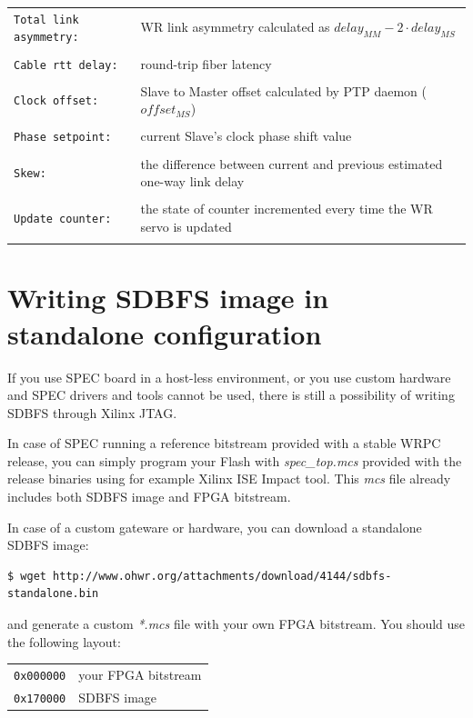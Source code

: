 \documentclass[a4paper, 12pt]{article}
\newcommand{\code}[1]{\texttt{#1}}
\begin{document}
\begin{longtable}{  p{4.5cm}  p{10cm} }
  \code{Total link asymmetry:} & WR link asymmetry calculated as
\( delay_{MM} - 2 \cdot delay_{MS} \)\\
 & \\

  \code{Cable rtt delay:} & round-trip fiber latency\\
 & \\

  \code{Clock offset:} & Slave to Master offset calculated by PTP daemon
(\( offset_{MS} \))\\
 & \\

  \code{Phase setpoint:} & current Slave's clock phase shift value\\
 & \\

  \code{Skew:} & the difference between current and previous estimated
one-way link delay\\
 & \\

  \code{Update counter:} & the state of counter incremented every time
the WR servo is updated\\
 & \\

\end{longtable}



\clearpage
\section{Writing SDBFS image in standalone configuration}
\label{Writing SDBFS image in standalone configuration}

If you use SPEC board in a host-less environment, or you use custom
hardware and SPEC drivers and tools cannot be used, there is still a
possibility of writing SDBFS through Xilinx JTAG.

\vspace{1em}
In case of SPEC running a reference bitstream provided with a stable
WRPC release, you can simply program your Flash with \textit{spec\_top.mcs}
provided with the release binaries using for example Xilinx ISE Impact tool.
This \textit{mcs} file already includes both SDBFS image and FPGA bitstream.

In case of a custom gateware or hardware, you can download a standalone
SDBFS image:
\begin{lstlisting}
$ wget http://www.ohwr.org/attachments/download/4144/sdbfs-standalone.bin
\end{lstlisting}
and generate a custom \textit{*.mcs} file with your own FPGA bitstream. You should
use the following layout:
\begin{longtable}{  l  l }
\code{0x000000} & your FPGA bitstream \\
\code{0x170000} & SDBFS image\\
\end{longtable}
\end{document}
